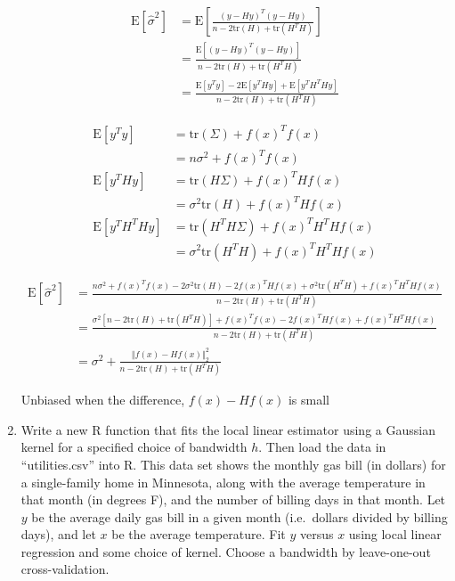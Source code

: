 \documentclass[10pt]{article}
\begin{document}
\begin{enumerate}[label=(\Alph*)]
        \begin{align*}
            \text{E} \left[ \hat{\sigma}^2\right] &= \text{E} \left[ \frac{(y - Hy)^T (y - Hy)}{n - 2\mbox{tr}(H) + \mbox{tr}(H^T H)} \right] \\
            &= \frac{\text{E}[(y - Hy)^T (y - Hy)]}{n - 2\mbox{tr}(H) + \mbox{tr}(H^T H)} \\
            &= \frac{\text{E}[y^Ty] - 2 \text{E}[y^T H y] + \text{E}[y^T H^T H y]}{n - 2\mbox{tr}(H) + \mbox{tr}(H^T H)}
        \end{align*}

        \begin{align*}
            \text{E}[y^Ty] &= \mbox{tr}( \Sigma) + f(x)^T f(x) \\
            &= n \sigma^2 + f(x)^T f(x) \\
            \text{E}[y^T H y] &= \mbox{tr}(H \Sigma) + f(x)^T H f(x) \\
            &= \sigma^2 \mbox{tr}(H) + f(x)^T H f(x) \\
            \text{E}[y^T H^T H y] &= \mbox{tr}(H^T H \Sigma) + f(x)^T H^T H f(x) \\
            &= \sigma^2 \mbox{tr}(H^T H) + f(x)^T H^T H f(x)
        \end{align*}

        \begin{align*}
            \text{E} \left[ \hat{\sigma}^2\right] &= \frac{n \sigma^2 + f(x)^T f(x) - 2\sigma^2 \mbox{tr}(H) - 2 f(x)^T H f(x) + \sigma^2 \mbox{tr}(H^T H) + f(x)^T H^T H f(x)}{n - 2\mbox{tr}(H) + \mbox{tr}(H^T H)}\\
            &= \frac{\sigma^2 [n - 2 \mbox{tr}(H)+ \mbox{tr}(H^T H)] + f(x)^T f(x)  - 2 f(x)^T H f(x)  + f(x)^T H^T H f(x)}{n - 2\mbox{tr}(H) + \mbox{tr}(H^T H)}\\
            &= \sigma^2 + \frac{\Vert f(x) - H f(x)\Vert_2^2}{n - 2\mbox{tr}(H) + \mbox{tr}(H^T H)}
        \end{align*}

        Unbiased when the difference, $f(x) - H f(x)$ is small

        \item Write a new R function that fits the local linear estimator using a Gaussian kernel for a specified choice of bandwidth $h$. Then load the data in ``utilities.csv'' into R. This data set shows the monthly gas bill (in dollars) for a single-family home in Minnesota, along with the average temperature in that month (in degrees F), and the number of billing days in that month.  Let $y$ be the average daily gas bill in a given month (i.e.~dollars divided by billing days), and let $x$ be the average temperature.  Fit $y$ versus $x$ using local linear regression and some choice of kernel.  Choose a bandwidth by leave-one-out cross-validation.


\end{enumerate}
\end{document}
